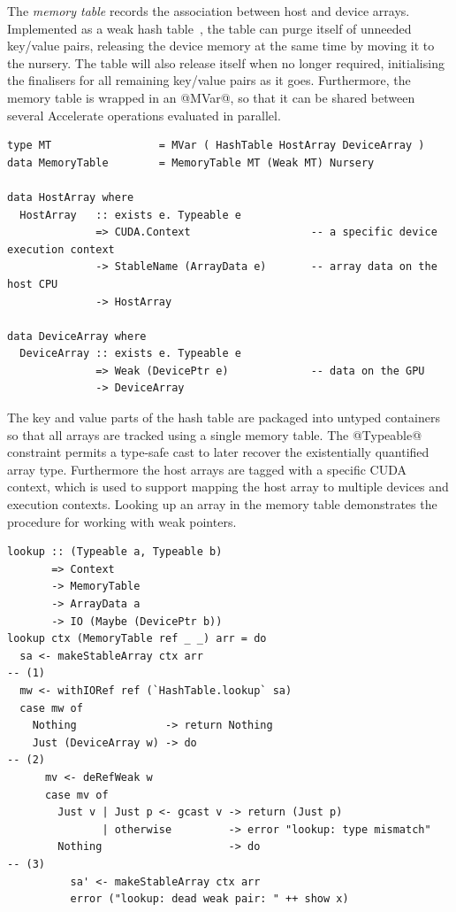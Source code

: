 The \emph{memory table} records the association between host and device arrays.
Implemented as a weak hash table~\cite{PeytonJones:2000ks}, the table can purge
itself of unneeded key/value pairs, releasing the device memory at the same time
by moving it to the nursery. The table will also release itself when no longer
required, initialising the finalisers for all remaining key/value pairs as it
goes. Furthermore, the memory table is wrapped in an @MVar@, so that it can
be shared between several Accelerate operations evaluated in parallel.
%
\begin{lstlisting}[style=haskell]
type MT                 = MVar ( HashTable HostArray DeviceArray )
data MemoryTable        = MemoryTable MT (Weak MT) Nursery

data HostArray where
  HostArray   :: exists e. Typeable e
              => CUDA.Context                   -- a specific device execution context
              -> StableName (ArrayData e)       -- array data on the host CPU
              -> HostArray

data DeviceArray where
  DeviceArray :: exists e. Typeable e
              => Weak (DevicePtr e)             -- data on the GPU
              -> DeviceArray
\end{lstlisting}
%
The key and value parts of the hash table are packaged into untyped containers
so that all arrays are tracked using a single memory table. The @Typeable@
constraint permits a type-safe cast to later recover the existentially
quantified array type. Furthermore the host arrays are tagged with a specific
CUDA context, which is used to support mapping the host array to multiple
devices and execution contexts. Looking up an array in the memory table
demonstrates the procedure for working with weak pointers.
%
\begin{lstlisting}[style=haskell]
lookup :: (Typeable a, Typeable b)
       => Context
       -> MemoryTable
       -> ArrayData a
       -> IO (Maybe (DevicePtr b))
lookup ctx (MemoryTable ref _ _) arr = do
  sa <- makeStableArray ctx arr                                         -- (1)
  mw <- withIORef ref (`HashTable.lookup` sa)
  case mw of
    Nothing              -> return Nothing
    Just (DeviceArray w) -> do                                          -- (2)
      mv <- deRefWeak w
      case mv of
        Just v | Just p <- gcast v -> return (Just p)
               | otherwise         -> error "lookup: type mismatch"
        Nothing                    -> do                                -- (3)
          sa' <- makeStableArray ctx arr
          error ("lookup: dead weak pair: " ++ show x)
\end{lstlisting}
